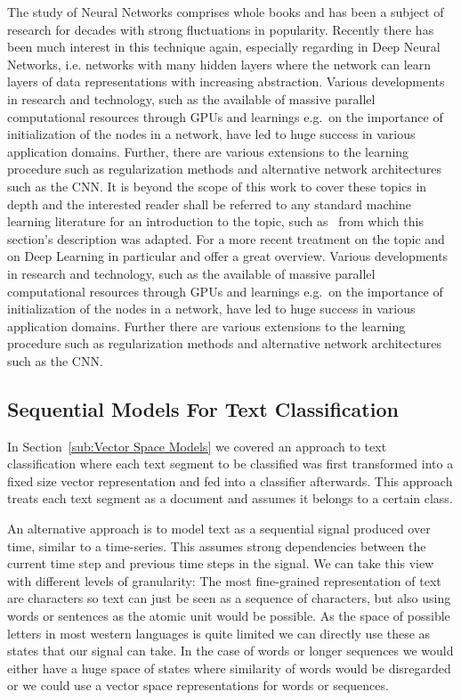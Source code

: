 The study of Neural Networks comprises whole books and has been a subject of research for decades with strong fluctuations in popularity.
Recently there has been much interest in this technique again, especially regarding in Deep Neural Networks, i.e. networks with many hidden layers where the network can learn layers of data representations with increasing abstraction.
Various developments in research and technology, such as the available of massive parallel computational resources through \glspl{GPU} and learnings e.g.\ on the importance of initialization of the nodes in a network, have led to huge success in various application domains. Further, there are various extensions to the learning procedure such as regularization methods and alternative network architectures such as the \gls{CNN}. It is beyond the scope of this work to cover these topics in depth and the interested reader shall be referred to any standard machine learning literature for an introduction to the topic, such as~\cite{Bishop:2006aa} from which this section's description was adapted. For a more recent treatment on the topic and on \gls{Deep Learning} in particular \cite{Bengio:2015aa} and \cite{Cho:2014aa} offer a great overview.
Various developments in research and technology, such as the available of massive parallel computational resources through \glspl{GPU} and learnings e.g.\ on the importance of initialization of the nodes in a network, have led to huge success in various application domains. Further there are various extensions to the learning procedure such as regularization methods and alternative network architectures such as the \gls{CNN}.

\subsection{Sequential Models For Text Classification}
\label{sub:Sequential Models For Text Classification}

In Section~\ref{sub:Vector Space Models} we covered an approach to text classification where each text segment to be classified was first transformed into a fixed size vector representation and fed into a classifier afterwards. This approach treats each text segment as a document and assumes it belongs to a certain class.

An alternative approach is to model text as a sequential signal produced over time, similar to a time-series. This assumes strong dependencies between the current time step and previous time steps in the signal.
We can take this view with different levels of granularity: The most fine-grained representation of text are characters so text can just be seen as a sequence of characters, but also using words or sentences as the atomic unit would be possible. As the space of possible letters in most western languages is quite limited we can directly use these as states that our signal can take. In the case of words or longer sequences we would either have a huge space of states where similarity of words would be disregarded or we could use a vector space representations for words or sequences.

